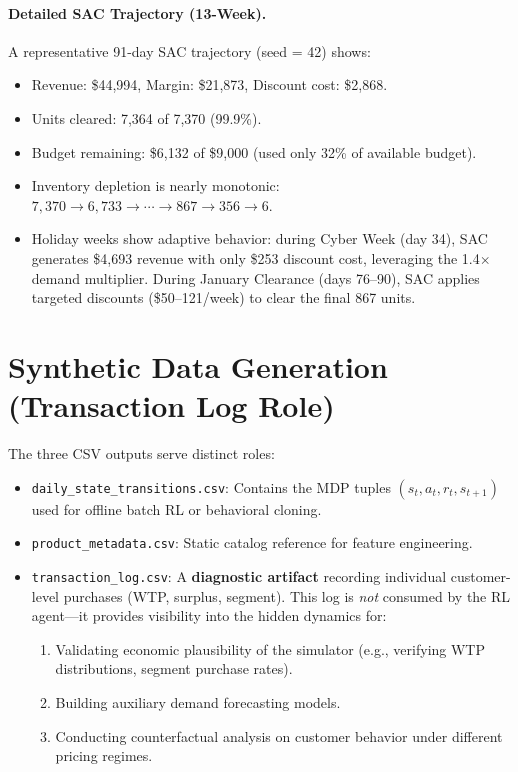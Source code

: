 \documentclass[11pt,a4paper]{article}
\begin{document}
\paragraph{Detailed SAC Trajectory (13-Week).}
A representative 91-day SAC trajectory (seed = 42) shows:
\begin{itemize}
    \item Revenue: \$44,994, Margin: \$21,873, Discount cost: \$2,868.
    \item Units cleared: 7,364 of 7,370 (99.9\%).
    \item Budget remaining: \$6,132 of \$9,000 (used only 32\% of available budget).
    \item Inventory depletion is nearly monotonic: $7{,}370 \to 6{,}733 \to \cdots \to 867 \to 356 \to 6$.
    \item Holiday weeks show adaptive behavior: during Cyber Week (day 34), SAC generates \$4,693 revenue with only \$253 discount cost, leveraging the 1.4$\times$ demand multiplier. During January Clearance (days 76--90), SAC applies targeted discounts (\$50--121/week) to clear the final 867 units.
\end{itemize}

\section{Synthetic Data Generation (Transaction Log Role)}
\label{sec:txn_role}

The three CSV outputs serve distinct roles:
\begin{itemize}
    \item \texttt{daily\_state\_transitions.csv}: Contains the MDP tuples $(s_t, a_t, r_t, s_{t+1})$ used for offline batch RL or behavioral cloning.
    \item \texttt{product\_metadata.csv}: Static catalog reference for feature engineering.
    \item \texttt{transaction\_log.csv}: A \textbf{diagnostic artifact} recording individual customer-level purchases (WTP, surplus, segment). This log is \emph{not} consumed by the RL agent---it provides visibility into the hidden dynamics for:
    \begin{enumerate}
        \item Validating economic plausibility of the simulator (e.g., verifying WTP distributions, segment purchase rates).
        \item Building auxiliary demand forecasting models.
        \item Conducting counterfactual analysis on customer behavior under different pricing regimes.
    \end{enumerate}
\end{itemize}
\end{document}
